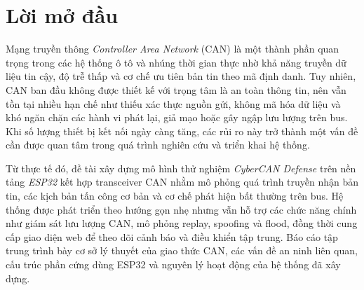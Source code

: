 \chapter*{Lời mở đầu}

Mạng truyền thông \textit{Controller Area Network} (CAN) là một thành phần quan trọng trong
các hệ thống ô tô và nhúng thời gian thực nhờ khả năng truyền dữ liệu tin cậy, độ trễ thấp
và cơ chế ưu tiên bản tin theo mã định danh. Tuy nhiên, CAN ban đầu không được thiết kế
với trọng tâm là an toàn thông tin, nên vẫn tồn tại nhiều hạn chế như thiếu xác thực nguồn
gửi, không mã hóa dữ liệu và khó ngăn chặn các hành vi phát lại, giả mạo hoặc gây ngập
lưu lượng trên bus. Khi số lượng thiết bị kết nối ngày càng tăng, các rủi ro này trở thành
một vấn đề cần được quan tâm trong quá trình nghiên cứu và triển khai hệ thống.

Từ thực tế đó, đề tài xây dựng mô hình thử nghiệm \textit{CyberCAN Defense} trên nền tảng
\textit{ESP32} kết hợp transceiver CAN nhằm mô phỏng quá trình truyền nhận bản tin, các
kịch bản tấn công cơ bản và cơ chế phát hiện bất thường trên bus. Hệ thống được phát triển
theo hướng gọn nhẹ nhưng vẫn hỗ trợ các chức năng chính như giám sát lưu lượng CAN,
mô phỏng replay, spoofing và flood, đồng thời cung cấp giao diện web để theo dõi cảnh báo
và điều khiển tập trung. Báo cáo tập trung trình bày cơ sở lý thuyết của giao thức CAN, các
vấn đề an ninh liên quan, cấu trúc phần cứng dùng ESP32 và nguyên lý hoạt động của hệ
thống đã xây dựng.
